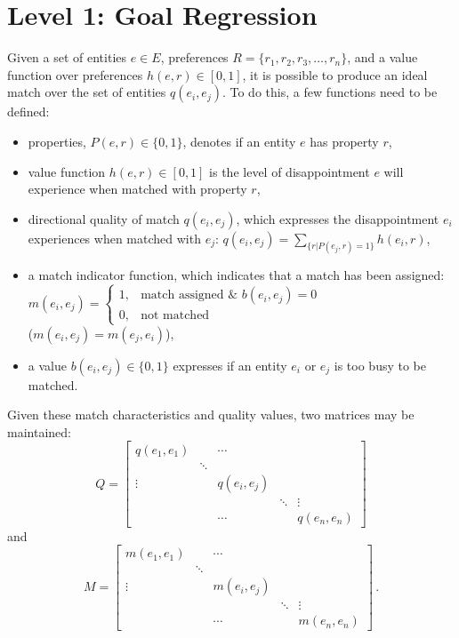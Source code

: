 \documentclass[compsoc,journal,letterpaper,10pt,draftclsnofoot,onecolumn]{IEEEtran}
\begin{document}
\section*{Level 1: Goal Regression}

Given a set of entities $e\in E$, preferences $R=\{r_1,r_2,r_3,\ldots,r_n\}$, and a value function over preferences $h(e,r)\in [0,1]$, it is possible to produce an ideal match over the set of entities $q(e_i,e_j)$. To do this, a few functions need to be defined:
\begin{itemize}
\item properties, $P(e,r)\in\{0,1\}$, denotes if an entity $e$ has property $r$,
\item value function $h(e,r)\in[0,1]$ is the level of disappointment $e$ will experience when matched with property $r$,
\item directional quality of match $q(e_i,e_j)$, which expresses the disappointment $e_i$ experiences when matched with $e_j$: $q(e_i,e_j)=\displaystyle \sum_{\{r|P(e_j,r)=1\}} h(e_i,r)$,
\item a match indicator function, which indicates that a match has been assigned: \\
  $m(e_i,e_j) = \left\{ \begin{array}{cl}
1, & \text{match\ assigned\ \&\ }b(e_i,e_j)=0 \\ 0, & \text{not\ matched}
\end{array}\right.$ \\
  ($m(e_i,e_j)=m(e_j,e_i)$),
\item a value $b(e_i,e_j)\in \{0,1\}$ expresses if an entity $e_i$ or $e_j$ is too busy to be matched.
\end{itemize}
Given these match characteristics and quality values, two matrices may be maintained:
\begin{equation}
  Q = \left[
    \begin{array}{ccccc}
      q(e_1,e_1) & & \cdots & &  \\
      &  \ddots & & &   \\
      \vdots & & q(e_i,e_j) & &  \\
      & & & \ddots & \vdots \\
     & & \cdots & & q(e_n,e_n) 
    \end{array}
    \right]
\end{equation}
and
\begin{equation}
  M = \left[
    \begin{array}{ccccc}
      m(e_1,e_1) & &  \cdots & & \\
      & \ddots & & & \\
      \vdots & & m(e_i,e_j) & &  \\
      & & & \ddots & \vdots \\
      & & \cdots & & m(e_n,e_n)
    \end{array}
    \right]\,.
\end{equation}
\end{document}
